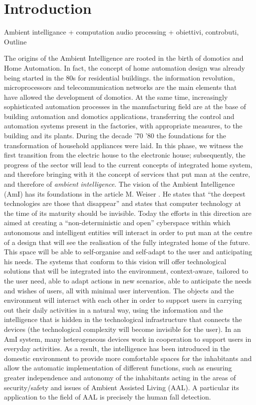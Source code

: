 \chapter{Introduction}\label{ch:intro}


Ambient intelligance + computation audio processing + obiettivi, controbuti, Outline

 The origins of the Ambient Intelligence are rooted in the birth of domotics and Home Automation. In fact, the concept of home automation design was already being started in the 80s for residential buildings. the information revolution, microprocessors and telecommunication networks are the main elements that have allowed the development of domotics. At the same time, increasingly sophisticated automation processes in the manufacturing field are at the base of building automation and domotics applications, transferring the control and automation systems present in the factories, with appropriate measures, to the building and its plants. During the decade '70 '80 the foundations for the transformation of household appliances were laid. In this phase, we witness the first transition from the electric house to the electronic house; subsequently, the progress of the sector will lead to the current concepts of integrated home system, and therefore bringing with it the concept of services that put man at the centre, and therefore of \textit{ambient intelligence}. The vision of the Ambient Intelligence (AmI) \cite{ducatel2001scenarios} has its foundations in the article M. Weiser \cite{weiser1991}. He states that ``the deepest technologies are those that disappear'' and states that computer technology at the time of its maturity should be invisible.
 Today the efforts in this direction are aimed at creating a ``non-deterministic and open'' cyberspace within which autonomous and intelligent entities will interact in order to put man at the centre of a design that will see the realisation of the fully integrated home of the future. This space will be able to self-organise and self-adapt to the user and anticipating his needs. The systems that conform to this vision will offer technological solutions that will be integrated into the environment, context-aware, tailored to the user need, able to adapt actions in new scenarios, able to anticipate the needs and wishes of users, all with minimal user intervention. 
 The objects and the environment will interact with each other in order to support users in carrying out their daily activities in a natural way, using the information and the intelligence that is hidden in the technological infrastructure that connects the devices (the technological complexity will become invisible for the user).
 In an AmI system, many heterogeneous devices work in cooperation to support users in everyday activities. As a result, the intelligence has been introduced in the domestic environment to provide more comfortable spaces for the inhabitants and allow the automatic implementation of different functions, such as ensuring greater independence and autonomy of the inhabitants acting in the areas of security/safety and issues of Ambient Assisted Living (AAL). A particular its application to the field of AAL is precisely the human fall detection. 
 
